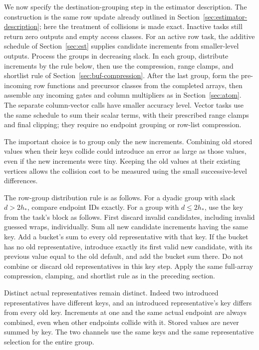 \documentclass[11pt]{article}
\numberwithin{equation}{section}
\theoremstyle{definition}
\theoremstyle{remark}
\begin{document}
We now specify the destination-grouping step in the estimator description. The construction is the same row update already outlined in Section~\ref{sec:estimator-description}; here the treatment of collisions is made exact. Inactive tasks still return zero outputs and empty access classes.  For an active
row task, the additive schedule of Section~\ref{sec:est} supplies
candidate increments from smaller-level outputs.  Process the groups in
decreasing slack.  In each group, distribute increments by the rule below,
then use the compression, range clamps, and shortlist rule of
Section~\ref{sec:buf-compression}.  After the last group, form the
pre-incoming row functions and precursor classes from the completed arrays,
then assemble any incoming gates and column multipliers as in
Section~\ref{sec:atom}.  The separate column-vector calls have smaller
accuracy level.  Vector tasks use the same schedule to sum their scalar terms,
with their prescribed range clamps and final clipping; they require no
endpoint grouping or row-list compression.

The important choice is to group only the new increments. Combining old stored values when their keys collide could introduce an error as large as those values, even if the new increments were tiny. Keeping the old values at their existing vertices allows the collision cost to be measured using the small successive-level differences.

The row-group distribution rule is as follows.
For a dyadic group with slack $d>2h_*$, compare endpoint IDs exactly.  For a
group with $d\le2h_*$, use the key from the task's block as follows.
First discard invalid candidates, including invalid guessed wraps,
individually.  Sum all new candidate increments having the same key.
Add a bucket's sum to every old representative with that key.  If the
bucket has no old representative, introduce exactly its first valid new
candidate, with its previous value equal to the old default, and add the
bucket sum there.  Do not combine or discard old representatives in this
key step.  Apply the same full-array compression, clamping, and shortlist
rule as in the preceding section.

Distinct actual representatives remain distinct.  Indeed two introduced
representatives have different keys, and an introduced representative's
key differs from every old key.  Increments at one and the same actual
endpoint are always combined, even when other endpoints collide with it.
Stored values are never summed by key.  The two channels use the same keys
and the same representative selection for the entire group.
\end{document}

